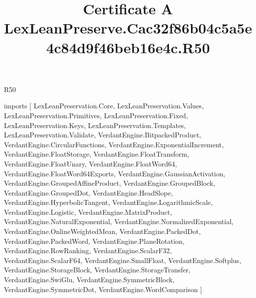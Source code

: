 \begin{lexlean}{R50}
\title{Certificate A LexLeanPreserve.Cac32f86b04c5a5e4c84d9f46beb16e4c.R50}
\begin{coremodule}
imports [
  LexLeanPreservation.Core,
  LexLeanPreservation.Values,
  LexLeanPreservation.Primitives,
  LexLeanPreservation.Fixed,
  LexLeanPreservation.Keys,
  LexLeanPreservation.Templates,
  LexLeanPreservation.Validate,
  VerdantEngine.BitpackedProduct,
  VerdantEngine.CircularFunctions,
  VerdantEngine.ExponentialIncrement,
  VerdantEngine.FloatStorage,
  VerdantEngine.FloatTransform,
  VerdantEngine.FloatUnary,
  VerdantEngine.FloatWord64,
  VerdantEngine.FloatWord64Exports,
  VerdantEngine.GaussianActivation,
  VerdantEngine.GroupedAffineProduct,
  VerdantEngine.GroupedBlock,
  VerdantEngine.GroupedDot,
  VerdantEngine.HeadSlope,
  VerdantEngine.HyperbolicTangent,
  VerdantEngine.LogarithmicScale,
  VerdantEngine.Logistic,
  VerdantEngine.MatrixProduct,
  VerdantEngine.NaturalExponential,
  VerdantEngine.NormalizedExponential,
  VerdantEngine.OnlineWeightedMean,
  VerdantEngine.PackedDot,
  VerdantEngine.PackedWord,
  VerdantEngine.PlaneRotation,
  VerdantEngine.RowRanking,
  VerdantEngine.ScalarF32,
  VerdantEngine.ScalarF64,
  VerdantEngine.SmallFloat,
  VerdantEngine.Softplus,
  VerdantEngine.StorageBlock,
  VerdantEngine.StorageTransfer,
  VerdantEngine.SwiGlu,
  VerdantEngine.SymmetricBlock,
  VerdantEngine.SymmetricDot,
  VerdantEngine.WordComparison
]


\end{coremodule}
\end{lexlean}
